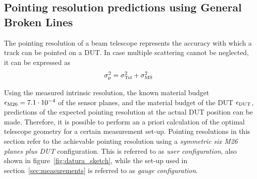 


\subsection{Pointing resolution predictions using General Broken Lines}

The pointing resolution of a beam telescope represents the accuracy with which a track can be pointed on a DUT. 
In case multiple scattering cannot be neglected, it can be expressed as
\begin{equation}
 \sigma_{\textrm{p}}^2 = \sigma_{\textrm{Tel}}^2 + \sigma_{\textrm{MS}}^2
\end{equation}

\noindent
Using the measured intrinsic resolution, the known material budget $\mathnormal{\epsilon_{\textrm{M26}}} = 7.1\cdot 10^{-4}$ of the sensor planes, and the material budget of the DUT $\mathnormal{\epsilon_{\textrm{DUT}}}$,
 predictions of the expected pointing resolution at the actual DUT position can be made. 
Therefore, it is possible to perform an a priori calculation of the optimal telescope geometry for a certain measurement set-up. 
Pointing resolutions in this section refer to the achievable pointing resolution using a \textit{symmetric six M26 planes plus DUT} configuration. 
This is referred to as \textit{user configuration}, also shown in figure~\ref{fig:datura_sketch}, while the set-up used in section~\ref{sec:measurements} is referred to as \textit{gauge configuration}. 

